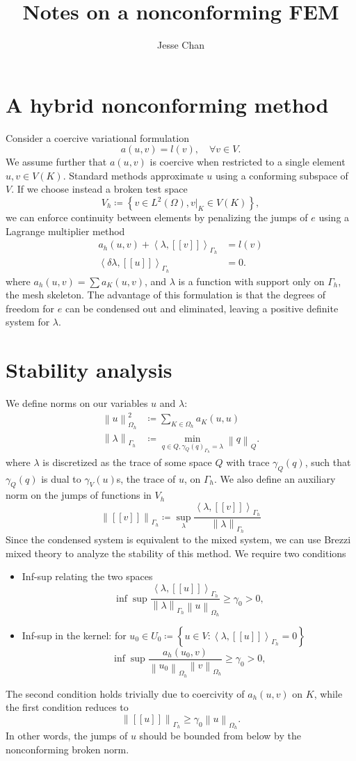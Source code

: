 \documentclass[final,leqno]{siamltex}
\title{Notes on a nonconforming FEM}
\author{Jesse Chan}
\date{}
\newcommand{\nor}[1]{\left\| #1 \right\|}
\newcommand{\LRp}[1]{\left( #1 \right)}
\newcommand{\LRs}[1]{\left[ #1 \right]}
\newcommand{\LRa}[1]{\left\langle #1 \right\rangle}
\newcommand{\LRc}[1]{\left\{ #1 \right\}}
\newcommand{\jump}[1] {\ensuremath{\LRs{\!\left[#1\right]\!}}}
\renewcommand{\L}{L^2\LRp{\Omega}}
\newcommand{\Gh}{\Gamma_h}
\newcommand{\Oh}{\Omega_h}
\begin{document}
\maketitle

\section{A hybrid nonconforming method}

Consider a coercive variational formulation
\[
a(u,v) = l(v), \quad \forall v\in V.
\]
We assume further that $a(u,v)$ is coercive when restricted to a single element $u,v \in V(K)$.  
Standard methods approximate $u$ using a conforming subspace of $V$.  If we choose instead a broken test space 
\[
V_h \coloneqq \LRc{ v\in \L, \left.v\right|_K \in V(K)},
\]
 we can enforce continuity between elements by penalizing the jumps of $e$ using a Lagrange multiplier method
\begin{align*}
a_h(u,v) + \LRa{\lambda, \jump{v}}_{\Gh}&= l(v)\\
\LRa{\delta \lambda, \jump{u}}_{\Gh} &= 0.
\end{align*}
where $a_h(u,v) = \sum a_K(u,v)$, and  $\lambda$ is a function with support only on $\Gh$, the mesh skeleton. The advantage of this formulation is that the degrees of freedom for $e$ can be condensed out and eliminated, leaving a positive definite system for $\lambda$.  

\section{Stability analysis}

We define norms on our variables $u$ and $\lambda$:
\begin{align*}
\nor{u}_{\Oh}^2 &\coloneqq \sum_{K\in \Oh} a_K(u,u)\\
\nor{\lambda}_{\Gh} &\coloneqq \min_{q\in Q, \gamma_Q(q)_{\Gh} = \lambda} \nor{q}_{Q}.
\end{align*}
where $\lambda$ is discretized as the trace of some space $Q$ with trace $\gamma_Q(q)$, such that $\gamma_Q(q)$ is dual to $\gamma_V(u)$s, the trace of $u$, on $\Gh$. 
We also define an auxiliary norm on the jumps of functions in $V_h$
\[
\nor{\jump{v}}_{\Gh} \coloneqq \sup_{\lambda} \frac{\LRa{\lambda,\jump{v}}_{\Gh}}{\nor{\lambda}_{\Gh}}
\]
Since the condensed system is equivalent to the mixed system, we can use Brezzi mixed theory to analyze the stability of this method.  We require two conditions
\begin{itemize}
\item Inf-sup relating the two spaces
\[
\inf \sup \frac{\LRa{\lambda,\jump{u}}_{\Gh}}{\nor{\lambda}_{\Gh}\nor{u}_{\Oh}}  \geq \gamma_0 > 0,
\]
\item Inf-sup in the kernel: for $u_0 \in U_0\coloneqq \LRc{u\in V: \LRa{\lambda,\jump{u}}_{\Gh} = 0}$
\[
\inf \sup \frac{a_h(u_0,v)}{\nor{u_0}_{\Oh}\nor{v}_{\Oh}} \geq \gamma_0 > 0,
\]
\end{itemize}
The second condition holds trivially due to coercivity of $a_h(u,v)$ on $K$, while the first condition reduces to 
\[
\nor{\jump{u}}_{\Gh} \geq \gamma_0\nor{u}_{\Oh}.
\]
In other words, the jumps of $u$ should be bounded from below by the nonconforming broken norm.  
\end{document}

